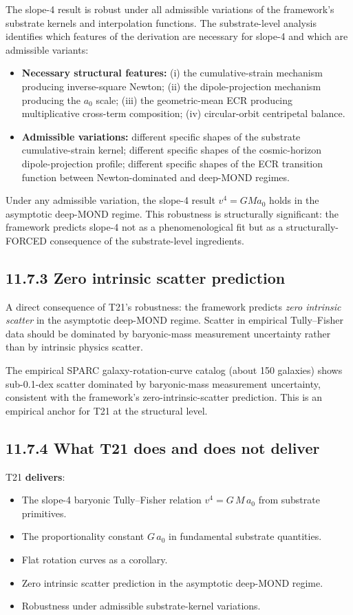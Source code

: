 \documentclass[11pt]{book}
\begin{document}
The slope-4 result is robust under all admissible variations of the framework's substrate kernels and interpolation functions. The substrate-level analysis identifies which features of the derivation are necessary for slope-4 and which are admissible variants:

\begin{itemize}
\item \textbf{Necessary structural features:} (i) the cumulative-strain mechanism producing inverse-square Newton; (ii) the dipole-projection mechanism producing the $a_0$ scale; (iii) the geometric-mean ECR producing multiplicative cross-term composition; (iv) circular-orbit centripetal balance.
\item \textbf{Admissible variations:} different specific shapes of the substrate cumulative-strain kernel; different specific shapes of the cosmic-horizon dipole-projection profile; different specific shapes of the ECR transition function between Newton-dominated and deep-MOND regimes.
\end{itemize}

Under any admissible variation, the slope-4 result $v^4 = GMa_0$ holds in the asymptotic deep-MOND regime. This robustness is structurally significant: the framework predicts slope-4 not as a phenomenological fit but as a structurally-FORCED consequence of the substrate-level ingredients.

\subsection{11.7.3 Zero intrinsic scatter prediction}

A direct consequence of T21's robustness: the framework predicts \textit{zero intrinsic scatter} in the asymptotic deep-MOND regime. Scatter in empirical Tully–Fisher data should be dominated by baryonic-mass measurement uncertainty rather than by intrinsic physics scatter.

The empirical SPARC galaxy-rotation-curve catalog (about 150 galaxies) shows sub-0.1-dex scatter dominated by baryonic-mass measurement uncertainty, consistent with the framework's zero-intrinsic-scatter prediction. This is an empirical anchor for T21 at the structural level.

\subsection{11.7.4 What T21 does and does not deliver}

T21 \textbf{delivers}:
\begin{itemize}
\item The slope-4 baryonic Tully–Fisher relation $v^4 = G\,M\,a_0$ from substrate primitives.
\item The proportionality constant $G\,a_0$ in fundamental substrate quantities.
\item Flat rotation curves as a corollary.
\item Zero intrinsic scatter prediction in the asymptotic deep-MOND regime.
\item Robustness under admissible substrate-kernel variations.
\end{itemize}
\end{document}
